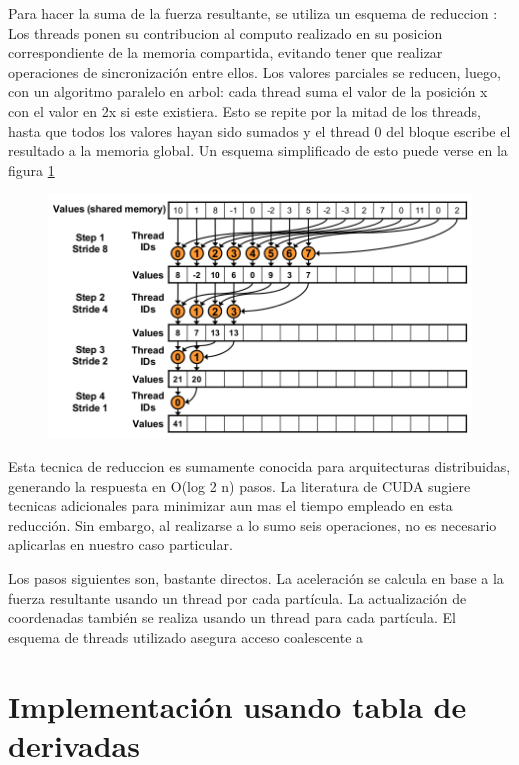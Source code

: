 Para hacer la suma de la fuerza resultante, se utiliza un esquema de reduccion \cite{cudaReductions}:
Los threads ponen su contribucion al computo realizado en su posicion correspondiente de la memoria compartida, evitando tener que realizar operaciones de sincronización entre ellos. Los valores parciales se reducen,
luego, con un algoritmo paralelo en arbol: cada thread suma el valor de la posición x con el valor en 2x si este existiera. Esto se repite por la mitad de los threads, hasta que todos los valores hayan sido sumados 
y el thread 0 del bloque escribe el resultado a la memoria global.
Un esquema simplificado de esto puede verse en la figura \ref{reduction}
\begin{figure}[htbp]
   \centering
   \includegraphics[width=\plotwidth]{img/md/reductions.png}
   \caption{}
   \label{reduction}
\end{figure}

Esta tecnica de reduccion es sumamente conocida para arquitecturas distribuidas, generando la respuesta en O(log 2 n) pasos. La literatura de CUDA sugiere tecnicas adicionales para minimizar aun mas el tiempo empleado en esta reducción. 
Sin embargo, al realizarse a lo sumo seis operaciones, no es necesario aplicarlas en nuestro caso particular.


Los pasos siguientes son, bastante directos.
La aceleración se calcula en base a la fuerza resultante usando un thread por cada partícula.
La actualización de coordenadas también se realiza usando un thread para cada partícula. El esquema de threads utilizado asegura acceso coalescente a 




\section{Implementación usando tabla de derivadas}
